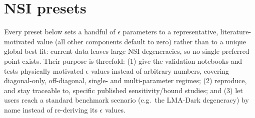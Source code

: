 \section{NSI presets}
\label{sec:nsi-presets}


\begin{implbox}
Every preset below sets a handful of $\epsilon$ parameters to a
representative, literature-motivated value (all other components default
to zero) rather than to a unique global best fit: current data leaves large
NSI degeneracies, so no single preferred point exists. Their purpose is
threefold: (1) give the validation notebooks and tests physically motivated
$\epsilon$ values instead of arbitrary numbers, covering diagonal-only,
off-diagonal, single- and multi-parameter regimes; (2) reproduce, and stay
traceable to, specific published sensitivity/bound studies; and
(3) let users reach a standard benchmark scenario (e.g.\ the LMA-Dark
degeneracy) by name instead of re-deriving its $\epsilon$ values.


\end{implbox}
